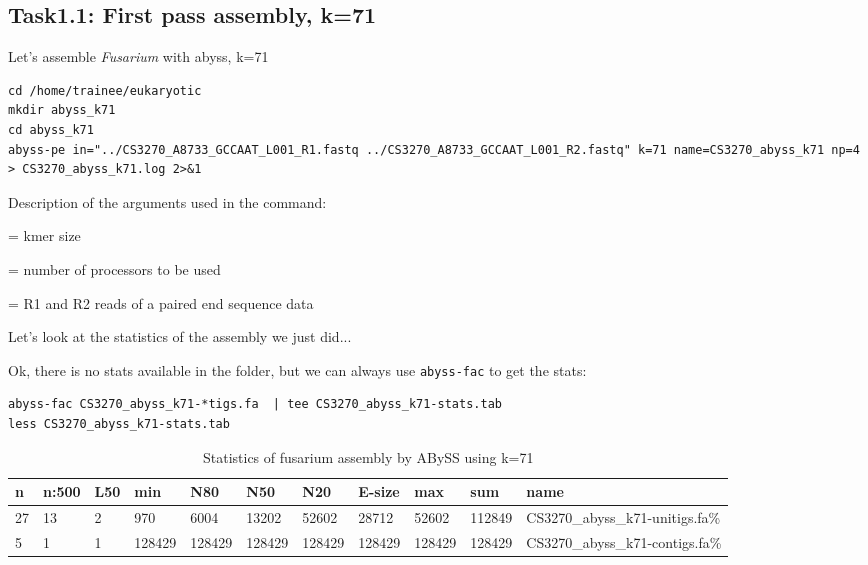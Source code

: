 \subsection{Task1.1: First pass assembly, k=71}

\begin{steps}
Let's assemble \textit{Fusarium} with abyss, k=71
\begin{lstlisting}
cd /home/trainee/eukaryotic
mkdir abyss_k71
cd abyss_k71
abyss-pe in="../CS3270_A8733_GCCAAT_L001_R1.fastq ../CS3270_A8733_GCCAAT_L001_R2.fastq" k=71 name=CS3270_abyss_k71 np=4 > CS3270_abyss_k71.log 2>&1
\end{lstlisting}
\end{steps}

Description of the arguments used in the command:
\begin{description}[style=multiline,labelindent=0cm,align=right,leftmargin=\descriptionlabelspace,rightmargin=1.5cm,font=\ttfamily]
  \item[k] = kmer size
  \item[np] = number of processors to be used
  \item[sequence file names] = R1 and R2 reads of a paired end sequence data
\end{description}

\begin{steps}
Let's look at the statistics of the assembly we just did... 

Ok, there is no stats available in the folder, but we can always use \texttt{abyss-fac} to get the stats:
\begin{lstlisting}
abyss-fac CS3270_abyss_k71-*tigs.fa  | tee CS3270_abyss_k71-stats.tab
less CS3270_abyss_k71-stats.tab
\end{lstlisting}
\end{steps}


\begin{table}[H]
\small
  \centering
  \caption{Statistics of fusarium assembly by ABySS using k=71}
    \begin{tabular}{lllllllllll}
    \toprule
    \textbf{n} & \textbf{n:500} & \textbf{L50} & \textbf{min} & \textbf{N80}& \textbf{N50}& \textbf{N20}& \textbf{E-size}& \textbf{max} & \textbf{sum}& \textbf{name}\\
    \midrule
    27 & 13 & 2 & 970 & 6004 & 13202 & 52602 & 28712 & 52602 & 112849 & CS3270\_abyss\_k71-unitigs.fa\% \\
    5 & 1 & 1 & 128429 & 128429 & 128429 & 128429 & 128429 & 128429 & 128429 & CS3270\_abyss\_k71-contigs.fa\% \\
    \bottomrule
    \end{tabular}
  \label{tab:fusariumk71}
\end{table}


